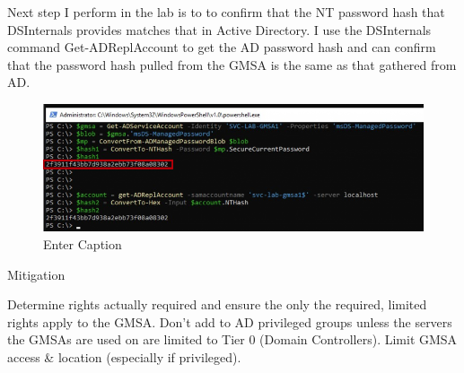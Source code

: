 Next step I perform in the lab is to to confirm that the NT password hash that DSInternals provides matches that in Active Directory.
I use the DSInternals command Get-ADReplAccount to get the AD password hash and can confirm that the password hash pulled from the GMSA is the same as that gathered from AD.
\begin{figure}
    \centering
    \includegraphics[width=0.75\linewidth]{dsintcmd.png}
    \caption{Enter Caption}
    \label{fig:placeholder}
\end{figure}


Mitigation

Determine rights actually required and ensure the only the required, limited rights apply to the GMSA.
Don’t add to AD privileged groups unless the servers the GMSAs are used on are limited to Tier 0 (Domain Controllers).
Limit GMSA access \& location (especially if privileged).
